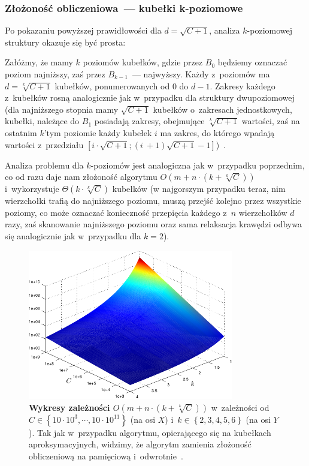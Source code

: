 \subsubsection{Złożoność obliczeniowa~--- kubełki k-poziomowe}

Po pokazaniu powyższej prawidłowości dla $d = \sqrt{C+1}$, analiza $k$-poziomowej struktury okazuje się być prosta:

Załóżmy, że mamy $k$ poziomów kubełków, gdzie przez $B_{0}$ będziemy oznaczać poziom najniższy, zaś przez $B_{k-1}$~--- najwyższy. Każdy z~poziomów ma $d = \sqrt[k]{C+1}$ kubełków, ponumerowanych od $0$ do $d-1$. Zakresy każdego z~kubełków rosną analogicznie jak w~przypadku dla struktury dwupoziomowej (dla najniższego stopnia mamy $\sqrt{C+1}$ kubełków o~zakresach jednostkowych, kubełki, należące do $B_{1}$ posiadają zakresy, obejmujące $\sqrt[k]{C+1}$ wartości, zaś na ostatnim $k$'tym poziomie każdy kubełek $i$ ma zakres, do którego wpadają wartości z~przedziału $ \left[ i \cdot \sqrt{C+1} ; \left( i~+ 1 \right) \sqrt{C+1} - 1 \right]$)~\cite[$4.1$--$4.3$]{NetOpt}.

Analiza problemu dla $k$-poziomów jest analogiczna jak w~przypadku poprzednim, co od razu daje nam złożoność algorytmu $ O \left( m + n \cdot \left( k + \sqrt[k]{C} \right) \right)$ i~wykorzystuje $ \Theta \left( k \cdot \sqrt[k]{C} \right)$ kubełków (w najgorszym przypadku teraz, nim wierzchołki trafią do najniższego poziomu, muszą przejść kolejno przez wszystkie poziomy, co może oznaczać konieczność przepięcia każdego z~$n$ wierzchołków $d$ razy, zaś skanowanie najniższego poziomu oraz sama relaksacja krawędzi odbywa się analogicznie jak w~przypadku dla $k=2$).

\begin{figure}[!htbp]
	\centering
	\includegraphics[width=0.8\textwidth]{Chapter_II/K-LEVEL-BUCKETS-Other/kLevel3DPlot_psfrag.pdf}
	\caption{}
	\caption{\textbf{Wykresy zależności $ O \left( m + n \cdot \left( k + \sqrt[k]{C} \right) \right) $ } w~zależności od $C \in \left\{ 10 \cdot 10^{3}, \cdots, 10 \cdot 10^{11} \right\}$ (na osi $X$) i~$k \in \left\{ 2, 3, 4, 5, 6 \right\}$ (na osi $Y$). Tak jak w~przypadku algorytmu, opierającego się na kubełkach aproksymacyjnych, widzimy, że algorytm zamienia złożoność obliczeniową na pamięciową i~odwrotnie~\cite[$7.1$--$7.4$]{NetOpt}. }\label{fig:plotKLevelBucketsComplexity}
\end{figure}

